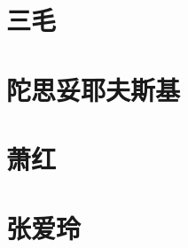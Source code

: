 \documentclass[12pt,utf8]{book}
\begin{document}
\chapter{三毛}



% 
% 
% 
% 
% 
% 
% 


\chapter{陀思妥耶夫斯基}

% 


\chapter{萧红}



 





\chapter{张爱玲}

















% 




% 
\end{document}
